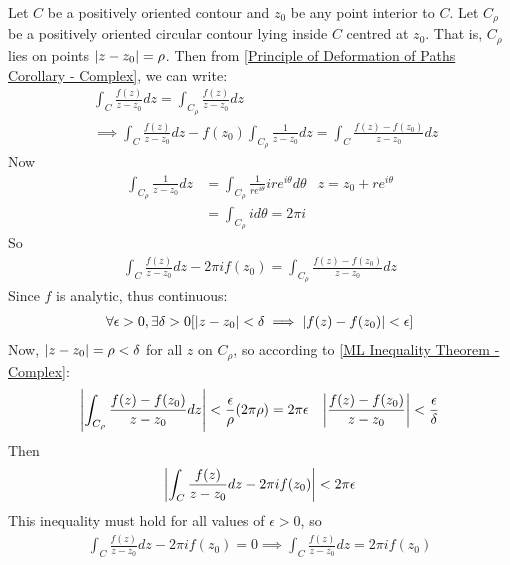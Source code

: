 \documentclass[12pt, english]{book}
\makeatletter
\renewenvironment{proof}[1][\proofname]{\par
	\pushQED{\qed}%
	\normalfont \topsep6\p@\@plus6\p@\relax
	\list{}{%
		\settowidth{\leftmargin}{\itshape\proofname:\hskip\labelsep}%
		\setlength{\labelwidth}{0pt}%
		\setlength{\itemindent}{-\leftmargin}%
	}%
	\item[\hskip\labelsep\itshape#1\@addpunct{:}]\ignorespaces
}{%
	\popQED\endlist\@endpefalse
}
\makeatother
\begin{document}
	\begin{proof}
		Let  \(C\) be a positively oriented contour and \(z_0\) be any point interior to \(C\). Let \(C_\rho\) be a positively oriented circular contour lying inside \(C\) centred at \(z_0\). That is, \(C_\rho\) lies on points \(\abs{z - z_0} = \rho\). Then from \cref{Principle of Deformation of Paths Corollary - Complex}, we can write: 
		\begin{align*}
			&\int_{C} \frac{f(z)}{z-z_0} dz = \int_{C_\rho} \frac{f(z)}{z-z_0} dz  \\
			&\implies \int_{C} \frac{f(z)}{z-z_0} dz - f(z_0) \int_{C_\rho} \frac{1}{z-z_0} dz = \int_{C} \frac{f(z) - f(z_0)}{z-z_0} dz 
		\end{align*}
		Now
		\begin{align*}
			\int_{C_\rho} \frac{1}{z-z_0} dz 
			&= \int_{C_\rho} \frac{1}{re^{i\theta}} ire^{i\theta} d\theta & z = z_0 + re^{i\theta} \\
			&= \int_{C_\rho} i d\theta = 2\pi i
		\end{align*}
		So
		\begin{align*}
			\int_{C} \frac{f(z)}{z - z_0}dz - 2\pi i f(z_0) = \int_{C_\rho} \frac{f(z) - f(z_0)}{z - z_0} dz
		\end{align*}
		Since \(f\) is analytic, thus continuous:
		\begin{align*}
			\forall \epsilon>0, \exists \delta>0 [\abs{z-z_0}<\delta \implies \abs{f(z) - f(z_0)}<\epsilon]
		\end{align*}
		Now, \(\abs{z - z_0} = \rho < \delta\) for all \(z\) on \(C_\rho\), so according to \cref{ML Inequality Theorem - Complex}:
		\begin{align*}
			\abs{\int_{C_\rho} \frac{f(z) - f(z_0)}{z - z_0} dz} &< \frac{\epsilon}{\rho} (2 \pi \rho) = 2 \pi \epsilon & \abs{\frac{f(z) - f(z_0)}{z - z_0}} < \frac{\epsilon}{\delta}
		\end{align*}
		Then
		\begin{align*}
			\abs{\int_{C} \frac{f(z)}{z - z_0}dz - 2\pi i f(z_0)} < 2 \pi \epsilon
		\end{align*}
		This inequality must hold for all values of \(\epsilon > 0\), so
		\begin{align*}
			\int_{C} \frac{f(z)}{z - z_0}dz - 2\pi i f(z_0) = 0 \implies \int_{C} \frac{f(z)}{z - z_0} dz = 2 \pi i f(z_0)
		\end{align*}
	\end{proof}
	
	
\end{document}
